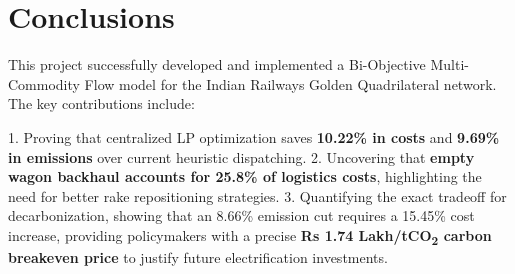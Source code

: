 \documentclass[11pt, a4paper]{article}
\numberwithin{equation}{section}
\numberwithin{figure}{section}
\numberwithin{table}{section}
\begin{document}
\section{Conclusions}
\label{sec:conclusions}

This project successfully developed and implemented a Bi-Objective Multi-Commodity Flow model for the Indian Railways Golden Quadrilateral network. The key contributions include:

1. Proving that centralized LP optimization saves \textbf{10.22\% in costs} and \textbf{9.69\% in emissions} over current heuristic dispatching.
2. Uncovering that \textbf{empty wagon backhaul accounts for 25.8\% of logistics costs}, highlighting the need for better rake repositioning strategies.
3. Quantifying the exact tradeoff for decarbonization, showing that an 8.66\% emission cut requires a 15.45\% cost increase, providing policymakers with a precise \textbf{Rs 1.74 Lakh/tCO\textsubscript{2} carbon breakeven price} to justify future electrification investments. 
\end{document}
